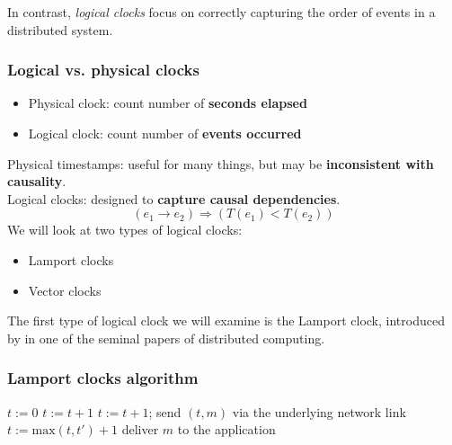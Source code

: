 In contrast, \emph{logical clocks} focus on correctly capturing the order of events in a distributed system.

\begin{frame}
    \label{s:logical-clocks}
    \frametitle{Logical vs. physical clocks}
    \begin{itemize}
        \item Physical clock: count number of \textbf{seconds elapsed}
        \item Logical clock: count number of \textbf{events occurred}\\[1em]
    \end{itemize}
    Physical timestamps: useful for many things, but may be \textbf{inconsistent with causality}.\\[1em]\pause
    Logical clocks: designed to \textbf{capture causal dependencies}.
    \[ (e_1 \rightarrow e_2) \Longrightarrow (T(e_1) < T(e_2)) \]\pause
    We will look at two types of logical clocks:
    \begin{itemize}
        \item Lamport clocks
        \item Vector clocks
    \end{itemize}
\end{frame}
\label{l:logical-clocks}

The first type of logical clock we will examine is the Lamport clock, introduced by \citet{Lamport:1978} in one of the seminal papers of distributed computing.

\begin{frame}
    \label{s:lamport-definition}
    \frametitle{Lamport clocks algorithm}
    \begin{algorithmic}
            \State $t := 0$ 
        \EndOn
        \State
            \State $t := t + 1$
        \EndOn
        \State
            \State $t := t + 1$; send $(t, m)$ via the underlying network link
        \EndOn
        \State
            \State $t := \mathrm{max}(t, t') + 1$
            \State deliver $m$ to the application
        \EndOn
    \end{algorithmic}
\end{frame}
\label{l:lamport-definition}


